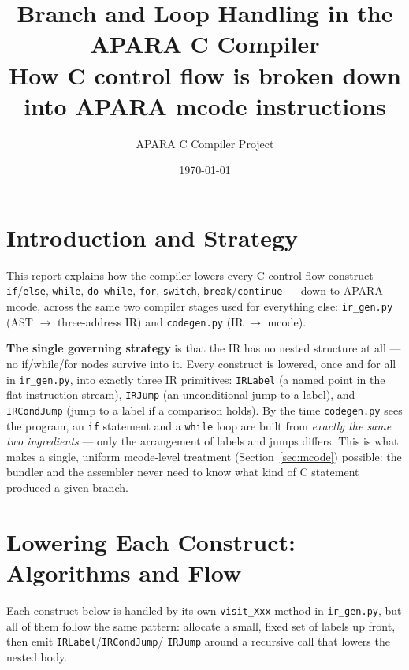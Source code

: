 \documentclass[11pt,a4paper]{article}
\title{\textbf{Branch and Loop Handling in the APARA C Compiler}\\[2mm]
\large How C control flow is broken down into APARA mcode instructions}
\author{APARA C Compiler Project}
\date{\today}
\begin{document}
\maketitle
\thispagestyle{fancy}
\vspace{-8mm}

\section{Introduction and Strategy}

This report explains how the compiler lowers every C control-flow construct ---
\texttt{if}/\texttt{else}, \texttt{while}, \texttt{do-while}, \texttt{for}, \texttt{switch},
\texttt{break}/\texttt{continue} --- down to APARA mcode, across the same two compiler
stages used for everything else: \texttt{ir\_gen.py} (AST $\to$ three-address IR) and
\texttt{codegen.py} (IR $\to$ mcode).

\textbf{The single governing strategy} is that the IR has no nested structure at all ---
no if/while/for nodes survive into it. Every construct is lowered, once and for all in
\texttt{ir\_gen.py}, into exactly three IR primitives: \texttt{IRLabel} (a named point in
the flat instruction stream), \texttt{IRJump} (an unconditional jump to a label), and
\texttt{IRCondJump} (jump to a label if a comparison holds). By the time \texttt{codegen.py}
sees the program, an \texttt{if} statement and a \texttt{while} loop are built from
\emph{exactly the same two ingredients} --- only the arrangement of labels and jumps
differs. This is what makes a single, uniform mcode-level treatment (Section~\ref{sec:mcode})
possible: the bundler and the assembler never need to know what kind of C statement
produced a given branch.

\section{Lowering Each Construct: Algorithms and Flow}

Each construct below is handled by its own \texttt{visit\_Xxx} method in
\texttt{ir\_gen.py}, but all of them follow the same pattern: allocate a small, fixed set of
labels up front, then emit \texttt{IRLabel}\allowbreak/\texttt{IRCondJump}\allowbreak/%
\texttt{IRJump} around a recursive call that lowers the nested body.
\end{document}
